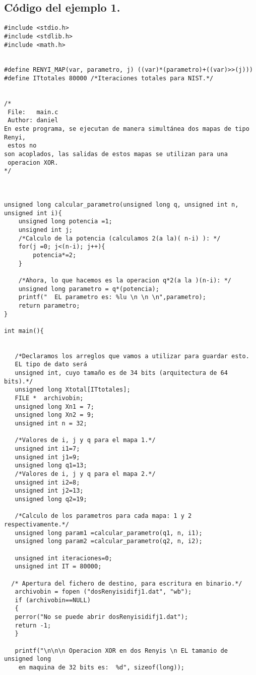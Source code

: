 \documentclass[12pt,3p]{elsarticle}
\begin{document}
\subsection{Código del ejemplo 1.}
\begin{verbatim}
#include <stdio.h>
#include <stdlib.h>
#include <math.h>


#define RENYI_MAP(var, parametro, j) ((var)*(parametro)+((var)>>(j)))
#define ITtotales 80000 /*Iteraciones totales para NIST.*/


/*
 File:   main.c
 Author: daniel
En este programa, se ejecutan de manera simultánea dos mapas de tipo Renyi,
 estos no
son acoplados, las salidas de estos mapas se utilizan para una
 operacion XOR.
*/



unsigned long calcular_parametro(unsigned long q, unsigned int n, unsigned int i){    
    unsigned long potencia =1;
    unsigned int j;
    /*Calculo de la potencia (calculamos 2(a la)( n-i) ): */
    for(j =0; j<(n-i); j++){
        potencia*=2;
    }

    /*Ahora, lo que hacemos es la operacion q*2(a la )(n-i): */
    unsigned long parametro = q*(potencia);
    printf("  EL parametro es: %lu \n \n \n",parametro);
    return parametro;
}

int main(){
 
   
   /*Declaramos los arreglos que vamos a utilizar para guardar esto. 
   EL tipo de dato será
   unsigned int, cuyo tamaño es de 34 bits (arquitectura de 64 bits).*/
   unsigned long Xtotal[ITtotales]; 
   FILE *  archivobin; 
   unsigned long Xn1 = 7;
   unsigned long Xn2 = 9;
   unsigned int n = 32;

   /*Valores de i, j y q para el mapa 1.*/
   unsigned int i1=7; 
   unsigned int j1=9; 
   unsigned long q1=13;
   /*Valores de i, j y q para el mapa 2.*/
   unsigned int i2=8; 
   unsigned int j2=13; 
   unsigned long q2=19;
 
   /*Calculo de los parametros para cada mapa: 1 y 2 respectivamente.*/
   unsigned long param1 =calcular_parametro(q1, n, i1);
   unsigned long param2 =calcular_parametro(q2, n, i2);
 
   unsigned int iteraciones=0;
   unsigned int IT = 80000;

  /* Apertura del fichero de destino, para escritura en binario.*/
   archivobin = fopen ("dosRenyisidifj1.dat", "wb");
   if (archivobin==NULL)
   {
   perror("No se puede abrir dosRenyisidifj1.dat");
   return -1;
   }
   
   printf("\n\n\n Operacion XOR en dos Renyis \n EL tamanio de unsigned long
    en maquina de 32 bits es:  %d", sizeof(long));




\end{verbatim}
\end{document}
